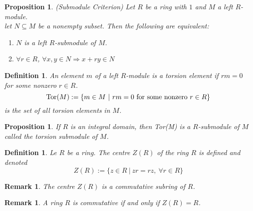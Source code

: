 \documentclass[a4paper,8pt]{article}
\newcommand{\hlt}[1]{\textit{{\color{blue}#1}}}
\newcommand{\tors}[1]{\textnormal{Tor}#1}
\theoremstyle{theorem}
\newtheorem{proposition}[theorem]{Proposition}
\newtheorem{definition}[theorem]{Definition}
\newtheorem{remark}[theorem]{Remark}
\begin{document}
\begin{proposition}
\hlt{(Submodule Criterion)}
Let $R$ be a ring with $1$ and $M$ a left $R$-module.\\
let $N \subseteq M$ be a nonempty subset. Then the following are equivalent:
\begin{enumerate}[label=(\roman*)]
\item $N$ is a left $R$-submodule of $M$.
\item $\forall r \in R$, $\forall x, y \in N \Rightarrow x+ry \in N$	
\end{enumerate}
\end{proposition}

\begin{definition}
An element $m$ of a left $R$-module is a \hlt{torsion element} if $rm=0$ for some nonzero $r \in R$.
\begin{equation}
\tors(M) := \{m \in M \ | \ rm=0 \textnormal{ for some nonzero } r \in R\} \nonumber
\end{equation}
is the set of all torsion elements in $M$.
\end{definition}

\begin{proposition}
If $R$ is an integral domain, then \tors(M) is a $R$-submodule of $M$ called the \hlt{torsion submodule of $M$}.
\end{proposition}

\begin{definition}
Le $R$ be a ring. The \hlt{centre $Z(R)$ of the ring $R$} is defined and denoted
\begin{equation}
Z(R) := \{z \in R \ | \ zr = rz, \ \forall r \in R\} \nonumber
\end{equation}
\end{definition}

\begin{remark}
The centre $Z(R)$ is a commutative subring of $R$.
\end{remark}

\begin{remark}
A ring $R$ is commutative if and only if $Z(R) = R$.
\end{remark}
\end{document}
